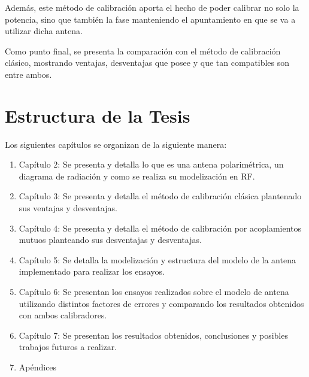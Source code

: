 Además, este método de calibración aporta el hecho de poder calibrar no solo la potencia, sino que también la fase 
manteniendo el apuntamiento en que se va a utilizar dicha antena.

Como punto final, se presenta la comparación con el método de calibración clásico, mostrando ventajas, desventajas 
que posee y que tan compatibles son entre ambos.


\section{Estructura de la Tesis}

Los siguientes capítulos se organizan de la siguiente manera: 

\begin{enumerate}
	\item Capítulo 2: Se presenta y detalla lo que es una antena polarimétrica, un diagrama de radiación y como se realiza su 
		modelización en RF.
	\item Capítulo 3: Se presenta y detalla el método de calibración clásica plantenado sus ventajas y desventajas.
	\item Capítulo 4: Se presenta y detalla el método de calibración por acoplamientos mutuos planteando sus desventajas y 
		desventajas.
	\item Capítulo 5: Se detalla la modelización y estructura del modelo de la antena implementado para realizar los ensayos.
	\item Capítulo 6: Se presentan los ensayos realizados sobre el modelo de antena utilizando distintos factores de errores y 
		comparando los resultados obtenidos con ambos calibradores.
	\item Capítulo 7: Se presentan los resultados obtenidos, conclusiones y posibles trabajos futuros a realizar.
	\item Apéndices
\end{enumerate}

